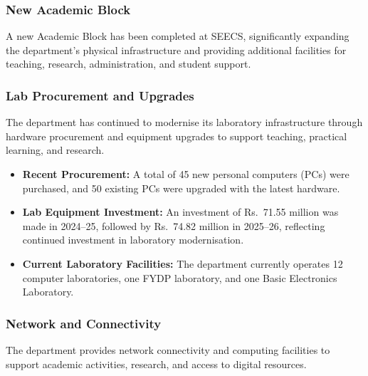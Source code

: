 \subsubsection{New Academic Block}
\label{subsubsec:new-academic-block}

A new Academic Block has been completed at SEECS,
significantly expanding the department's physical
infrastructure and providing additional facilities
for teaching, research, administration, and student support.

\subsubsection{Lab Procurement and Upgrades}
\label{subsubsec:lab-procurement-upgrades}

The department has continued to modernise its laboratory
infrastructure through hardware procurement and equipment
upgrades to support teaching, practical learning, and research.

\begin{itemize}[noitemsep, topsep=0pt]

    \item \textbf{Recent Procurement:}
    A total of 45 new personal computers (PCs) were purchased,
    and 50 existing PCs were upgraded with the latest hardware.

    \item \textbf{Lab Equipment Investment:}
    An investment of Rs.~71.55 million was made in 2024--25,
    followed by Rs.~74.82 million in 2025--26, reflecting
    continued investment in laboratory modernisation.

    \item \textbf{Current Laboratory Facilities:}
    The department currently operates 12 computer laboratories,
    one FYDP laboratory, and one Basic Electronics Laboratory.

\end{itemize}


\subsubsection{Network and Connectivity}
\label{subsubsec:network-connectivity}

The department provides network connectivity and computing
facilities to support academic activities, research, and
access to digital resources.

